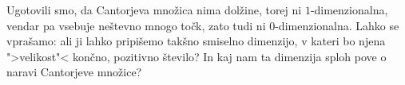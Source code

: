 Ugotovili smo, da Cantorjeva množica nima dolžine, torej ni \(1\)-dimenzionalna, vendar pa vsebuje neštevno mnogo točk, zato tudi ni \(0\)-dimenzionalna. Lahko se vprašamo: ali ji lahko pripišemo takšno smiselno dimenzijo, v kateri bo njena ">velikost"< končno, pozitivno število? In kaj nam ta dimenzija sploh pove o naravi Cantorjeve množice?